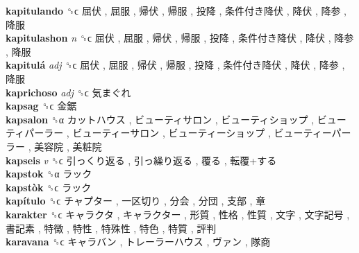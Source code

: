 \textbf{kapitulando} ␝ϲ   屈伏 ,  屈服 ,  帰伏 ,  帰服 ,  投降 ,  条件付き降伏 ,  降伏 ,  降参 ,  降服   \\
\textbf{kapitulashon} \emph{n}  ␝ϲ   屈伏 ,  屈服 ,  帰伏 ,  帰服 ,  投降 ,  条件付き降伏 ,  降伏 ,  降参 ,  降服   \\
\textbf{kapitulá} \emph{adj}  ␝ϲ   屈伏 ,  屈服 ,  帰伏 ,  帰服 ,  投降 ,  条件付き降伏 ,  降伏 ,  降参 ,  降服   \\
\textbf{kaprichoso} \emph{adj}  ␝ϲ   気まぐれ   \\
\textbf{kapsag} ␝ϲ   金鋸   \\
\textbf{kapsalon} ␝α   カットハウス ,  ビューティサロン ,  ビューティショップ ,  ビューティパーラー ,  ビューティーサロン ,  ビューティーショップ ,  ビューティーパーラー ,  美容院 ,  美粧院   \\
\textbf{kapseis} \emph{v}  ␝ϲ   引っくり返る ,  引っ繰り返る ,  覆る ,  転覆+する   \\
\textbf{kapstok} ␝α   ラック   \\
\textbf{kapstòk} ␝ϲ   ラック   \\
\textbf{kapítulo} ␝ϲ   チャプター ,  一区切り ,  分会 ,  分団 ,  支部 ,  章   \\
\textbf{karakter} ␝ϲ   キャラクタ ,  キャラクター ,  形質 ,  性格 ,  性質 ,  文字 ,  文字記号 ,  書記素 ,  特徴 ,  特性 ,  特殊性 ,  特色 ,  特質 ,  評判   \\
\textbf{karavana} ␝ϲ   キャラバン ,  トレーラーハウス ,  ヴァン ,  隊商   \\
